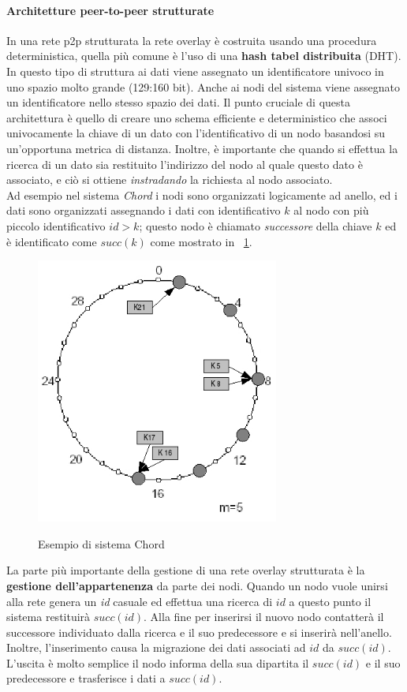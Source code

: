 \paragraph{Architetture peer-to-peer strutturate}
In una rete p2p strutturata la rete overlay è costruita usando una procedura deterministica, quella più comune è l'uso di una \textbf{hash tabel distribuita} (DHT). In questo tipo di struttura ai dati viene assegnato un identificatore univoco in uno spazio molto grande (129:160 bit). Anche ai nodi del sistema viene assegnato un identificatore nello stesso spazio dei dati. Il punto cruciale di questa architettura è quello di creare uno schema efficiente e deterministico che associ univocamente la chiave di un dato con l'identificativo di un nodo basandosi su un'opportuna metrica di distanza. Inoltre, è importante che quando si effettua la ricerca di un dato sia restituito l'indirizzo del nodo al quale questo dato è associato, e ciò si ottiene \emph{instradando} la richiesta al nodo associato.\\
Ad esempio nel sistema \emph{Chord} i nodi sono organizzati logicamente ad anello, ed i dati sono organizzati assegnando i dati con identificativo $k$ al nodo con più piccolo identificativo $id>k$; questo nodo è chiamato \emph{successore} della chiave $k$ ed è identificato come $succ(k)$ come mostrato in \figurename~\ref{fig:chordring}.\\
\begin{figure}[htb]
\centering
\includegraphics[width=8cm]{img/chordring.jpg}\\
\caption{Esempio di sistema Chord}\label{fig:chordring}
\end{figure}
La parte più importante della gestione di una rete overlay strutturata è la \textbf{gestione dell'appartenenza} da parte dei nodi. Quando un nodo vuole unirsi alla rete genera un \emph{id} casuale ed effettua una ricerca di $id$ a questo punto il sistema restituirà $succ(id)$. Alla fine per inserirsi il nuovo nodo contatterà il successore individuato dalla ricerca e il suo predecessore e si inserirà nell'anello. Inoltre, l'inserimento causa la migrazione dei dati associati ad $id$ da $succ(id)$.
L'uscita è molto semplice il nodo informa della sua dipartita il $succ(id)$ e il suo predecessore e trasferisce i dati a $succ(id)$.\\
